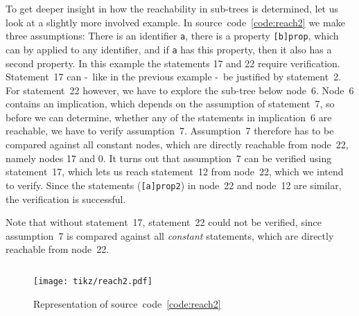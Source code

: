 \documentclass[british]{article}
\newenvironment{code}{\captionsetup{type=listing}}{}
\newcommand\prv{bc}
\newcommand\m[1]{\texttt{#1}}
\begin{document}
To get deeper insight in how the reachability in sub-trees is determined, let us
look at a slightly more involved example. In source~code~\ref{code:reach2} we
make three assumptions: There is an identifier \m{a}, there is a property
\m{[b]prop}, which can by applied to any identifier, and if \m{a} has this
property, then it also has a second property. In this example the statements 17
and 22 require verification. Statement~17 can -\ like in the previous example -\
be justified by statement~2. For statement~22 however, we have to explore the
sub-tree below node~6. Node~6 contains an implication, which depends on the
assumption of statement~7, so before we can determine, whether any of the
statements in implication~6 are reachable, we have to verify assumption~7.
Assumption~7 therefore has to be compared against all constant nodes, which are
directly reachable from node~22, namely nodes 17 and 0. It turns out that
assumption~7 can be verified using statement~17, which lets us reach
statement~12 from node~22, which we intend to verify. Since the statements
(\m{[a]prop2}) in node~22 and node~12 are similar, the verification is
successful.

Note that without statement~17, statement~22 could not be verified, since
assumption~7 is compared against all \emph{constant} statements, which are
directly reachable from node~22.
\pagebreak{}

\begin{code}
\label{code:reach2}
\inputminted[linenos]{\prv}{examples/reach2.prove}
\end{code}

\begin{figure}[!h]
\caption{Representation of source~code~\ref{code:reach2}}\label{fig:reach2}
\centering
\texttt{[image: tikz/reach2.pdf]}
\end{figure}

\pagebreak{}

\begingroup
{}
\setlength\bibitemsep{10pt}
\printbibliography\
\endgroup
\end{document}
